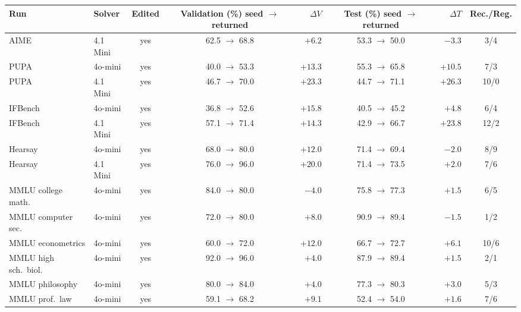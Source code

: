 \documentclass[11pt]{article}
\begin{document}
\begin{table}[htbp]
\centering
\small
\setlength{\tabcolsep}{3pt}
\begin{tabular}{llccrcrc}
\toprule
\rowcolor{midblue}Run & Solver & Edited & \shortstack{Validation (\%)\\seed $\rightarrow$ returned} & $\Delta V$ & \shortstack{Test (\%)\\seed $\rightarrow$ returned} & $\Delta T$ & Rec./Reg. \\
\midrule
AIME & 4.1 Mini & yes & 62.5 $\rightarrow$ 68.8 & $+6.2$ & 53.3 $\rightarrow$ 50.0 & $-3.3$ & 3/4 \\
\rowcolor{softgreen}PUPA & 4o-mini & yes & 40.0 $\rightarrow$ 53.3 & $+13.3$ & 55.3 $\rightarrow$ 65.8 & $+10.5$ & 7/3 \\
\rowcolor{softgreen}PUPA & 4.1 Mini & yes & 46.7 $\rightarrow$ 70.0 & $+23.3$ & 44.7 $\rightarrow$ 71.1 & $+26.3$ & 10/0 \\
\rowcolor{softgreen}IFBench & 4o-mini & yes & 36.8 $\rightarrow$ 52.6 & $+15.8$ & 40.5 $\rightarrow$ 45.2 & $+4.8$ & 6/4 \\
\rowcolor{softgreen}IFBench & 4.1 Mini & yes & 57.1 $\rightarrow$ 71.4 & $+14.3$ & 42.9 $\rightarrow$ 66.7 & $+23.8$ & 12/2 \\
Hearsay & 4o-mini & yes & 68.0 $\rightarrow$ 80.0 & $+12.0$ & 71.4 $\rightarrow$ 69.4 & $-2.0$ & 8/9 \\
\rowcolor{softgreen}Hearsay & 4.1 Mini & yes & 76.0 $\rightarrow$ 96.0 & $+20.0$ & 71.4 $\rightarrow$ 73.5 & $+2.0$ & 7/6 \\
\midrule
\rowcolor{softgreen}MMLU college math. & 4o-mini & yes & 84.0 $\rightarrow$ 80.0 & $-4.0$ & 75.8 $\rightarrow$ 77.3 & $+1.5$ & 6/5 \\
MMLU computer sec. & 4o-mini & yes & 72.0 $\rightarrow$ 80.0 & $+8.0$ & 90.9 $\rightarrow$ 89.4 & $-1.5$ & 1/2 \\
\rowcolor{softgreen}MMLU econometrics & 4o-mini & yes & 60.0 $\rightarrow$ 72.0 & $+12.0$ & 66.7 $\rightarrow$ 72.7 & $+6.1$ & 10/6 \\
\rowcolor{softgreen}MMLU high sch.\ biol. & 4o-mini & yes & 92.0 $\rightarrow$ 96.0 & $+4.0$ & 87.9 $\rightarrow$ 89.4 & $+1.5$ & 2/1 \\
\rowcolor{softgreen}MMLU philosophy & 4o-mini & yes & 80.0 $\rightarrow$ 84.0 & $+4.0$ & 77.3 $\rightarrow$ 80.3 & $+3.0$ & 5/3 \\
\rowcolor{softgreen}MMLU prof.\ law & 4o-mini & yes & 59.1 $\rightarrow$ 68.2 & $+9.1$ & 52.4 $\rightarrow$ 54.0 & $+1.6$ & 7/6 \\

\end{tabular}
\end{table}
\end{document}

